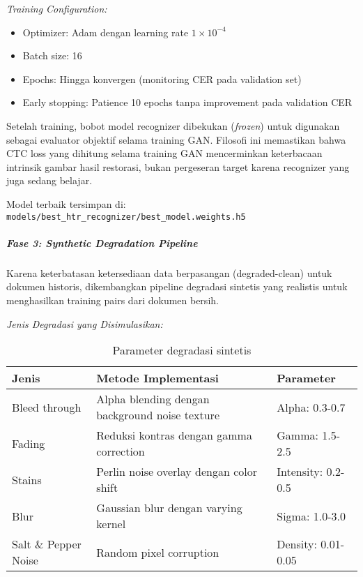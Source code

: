 \documentclass[12pt,a4paper]{article}
\begin{document}
\textit{Training Configuration:}
\begin{itemize}[leftmargin=*, nosep]
\item Optimizer: Adam dengan learning rate $1 \times 10^{-4}$
\item Batch size: 16
\item Epochs: Hingga konvergen (monitoring CER pada validation set)
\item Early stopping: Patience 10 epochs tanpa improvement pada validation CER
\end{itemize}

Setelah training, bobot model recognizer dibekukan (\textit{frozen}) untuk digunakan sebagai evaluator objektif selama training GAN. Filosofi ini memastikan bahwa CTC loss yang dihitung selama training GAN mencerminkan keterbacaan intrinsik gambar hasil restorasi, bukan pergeseran target karena recognizer yang juga sedang belajar.

Model terbaik tersimpan di: \texttt{models/best\_htr\_recognizer/best\_model.weights.h5}

\subparagraph{Fase 3: Synthetic Degradation Pipeline}

Karena keterbatasan ketersediaan data berpasangan (degraded-clean) untuk dokumen historis, dikembangkan pipeline degradasi sintetis yang realistis untuk menghasilkan training pairs dari dokumen bersih.

\textit{Jenis Degradasi yang Disimulasikan:}

\begin{table}[H]
\centering
\caption{Parameter degradasi sintetis}
\label{tab:synthetic-degradation}
\small
\begin{tabular}{|l|p{6cm}|p{4cm}|}
\hline
\textbf{Jenis} & \textbf{Metode Implementasi} & \textbf{Parameter} \\ \hline
Bleed through & Alpha blending dengan background noise texture & Alpha: 0.3-0.7 \\ \hline
Fading & Reduksi kontras dengan gamma correction & Gamma: 1.5-2.5 \\ \hline
Stains & Perlin noise overlay dengan color shift & Intensity: 0.2-0.5 \\ \hline
Blur & Gaussian blur dengan varying kernel & Sigma: 1.0-3.0 \\ \hline
Salt \& Pepper Noise & Random pixel corruption & Density: 0.01-0.05 \\ \hline
\end{tabular}
\end{table}
\end{document}

